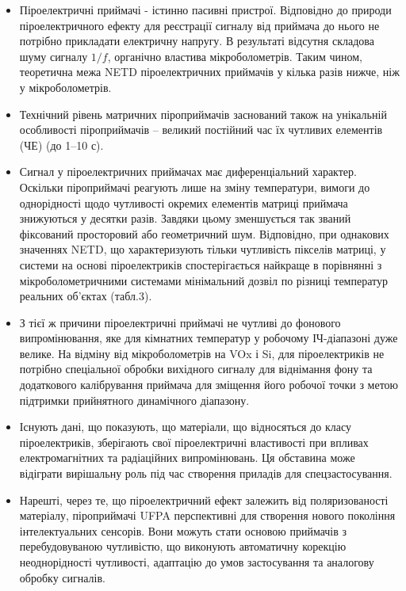 \documentclass[a4paper,14pt]{extreport}
\begin{document}
\begin{itemize}


\item Піроелектричні приймачі - істинно пасивні пристрої.
Відповідно до природи піроелектричного ефекту для реєстрації
сигналу від приймача до нього не потрібно прикладати електричну напругу. В результаті відсутня складова шуму сигналу $1/f$, органічно властива мікроболометрів. Таким чином, теоретична межа NETD піроелектричних приймачів
у кілька разів нижче, ніж у мікроболометрів.
\item Технічний рівень матричних піроприймачів заснований також
на унікальній особливості піроприймачів – великий постійний час їх чутливих елементів (ЧЕ) (до 1–10 с).
\item Сигнал у піроелектричних приймачах має диференціальний характер. Оскільки піроприймачі реагують лише на зміну температури, вимоги до однорідності щодо чутливості окремих елементів матриці приймача знижуються у десятки разів. Завдяки цьому зменшується так званий фіксований просторовий або геометричний шум. Відповідно, при однакових значеннях NETD, що характеризують
тільки чутливість пікселів матриці, у системи на основі
піроелектриків спостерігається найкраще в порівнянні з мікроболометричними системами мінімальний дозвіл по різниці
температур реальних об'єктах (табл.3).
\item З тієї ж причини піроелектричні приймачі не чутливі до фонового випромінювання, яке для кімнатних температур
у робочому ІЧ-діапазоні дуже велике. На відміну від мікроболометрів на VOx і Si, для піроелектриків не потрібно спеціальної
обробки вихідного сигналу для віднімання фону та додаткового калібрування приймача для зміщення його робочої точки з метою підтримки прийнятного динамічного діапазону.
\item Існують дані, що показують, що матеріали, що відносяться
до класу піроелектриків, зберігають свої піроелектричні
властивості при впливах електромагнітних та радіаційних
випромінювань. Ця обставина може відіграти вирішальну роль
під час створення приладів для спецзастосування.
\item Нарешті, через те, що піроелектричний ефект залежить від поляризованості матеріалу, піроприймачі UFPA перспективні для створення нового покоління інтелектуальних сенсорів. Вони
можуть стати основою приймачів з перебудовуваною чутливістю, що виконують автоматичну корекцію неоднорідності чутливості, адаптацію до умов застосування та аналогову обробку сигналів.
\end{itemize}
\end{document}
